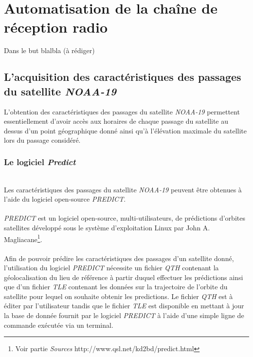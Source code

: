 \documentclass[12pt,fleqn]{book} %
\begin{document}
\part{Automatisation de la chaîne de réception radio}
Dans le but blalbla (à rédiger)
\chapter{L'acquisition des caractéristiques des passages du satellite \emph{NOAA-19}}
L'obtention des caractéristiques des passages du satellite \emph{NOAA-19} permettent essentiellement d'avoir accès aux horaires de chaque passage du satellite au dessus d'un point géographique donné ainsi qu'à l'élévation maximale du satellite lors du passage considéré.
\section{Le logiciel \emph{Predict}}
~\\\indent Les caractéristiques des passages du satellite \emph{NOAA-19} peuvent être obtenues à l'aide du logiciel open-source \emph{PREDICT}. 
~\\\\\emph{PREDICT} est un logiciel open-source, multi-utilisateurs, de prédictions d'orbites satellites développé sous le système d'exploitation Linux par John A. Magliacane\footnote{Voir partie \emph{Sources} http://www.qsl.net/kd2bd/predict.html}.
~\\\\Afin de pouvoir prédire les caractéristiques des passages d'un satellite donné, l'utilisation du logiciel \emph{PREDICT} nécessite un fichier \emph{QTH} contenant la géolocalisation du lieu de référence à partir duquel effectuer les prédictions ainsi que d'un fichier \emph{TLE} contenant les données sur la trajectoire de l'orbite du satellite pour lequel on souhaite obtenir les predictions. Le fichier \emph{QTH} est à éditer par l'utilisateur tandis que le fichier \emph{TLE} est disponible en mettant à jour la base de donnée fournit par le logiciel \emph{PREDICT} à l'aide d'une simple ligne de commande exécutée via un terminal.
\end{document}
